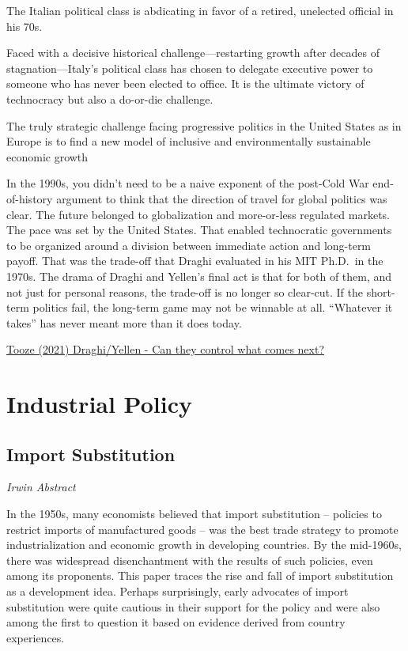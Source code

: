 \documentclass[
]{book}
\begin{document}
The Italian political class is abdicating in favor of a retired, unelected official in his 70s.

Faced with a decisive historical challenge---restarting growth after decades of stagnation---Italy's political class has chosen to delegate executive power to someone who has never been elected to office. It is the ultimate victory of technocracy but also a do-or-die challenge.

The truly strategic challenge facing progressive politics in the United States as in Europe is to find a new model of inclusive and environmentally sustainable economic growth

In the 1990s, you didn't need to be a naive exponent of the post-Cold War end-of-history argument to think that the direction of travel for global politics was clear. The future belonged to globalization and more-or-less regulated markets. The pace was set by the United States. That enabled technocratic governments to be organized around a division between immediate action and long-term payoff. That was the trade-off that Draghi evaluated in his MIT Ph.D.~in the 1970s. The drama of Draghi and Yellen's final act is that for both of them, and not just for personal reasons, the trade-off is no longer so clear-cut. If the short-term politics fail, the long-term game may not be winnable at all. ``Whatever it takes'' has never meant more than it does today.

\href{https://foreignpolicy.com/2021/04/01/janet-yellen-mario-draghi-italy-united-states-technocrats-capitalist-democracy/}{Tooze (2021) Draghi/Yellen - Can they control what comes next?}

\hypertarget{industrial-policy}{%
\section{Industrial Policy}\label{industrial-policy}}

\hypertarget{import-substitution}{%
\subsection{Import Substitution}\label{import-substitution}}

\emph{Irwin Abstract}

In the 1950s, many economists believed that import substitution -- policies to restrict imports of
manufactured goods -- was the best trade strategy to promote industrialization and economic
growth in developing countries. By the mid-1960s, there was widespread disenchantment with
the results of such policies, even among its proponents. This paper traces the rise and fall of
import substitution as a development idea. Perhaps surprisingly, early advocates of import
substitution were quite cautious in their support for the policy and were also among the first to
question it based on evidence derived from country experiences.
\end{document}
